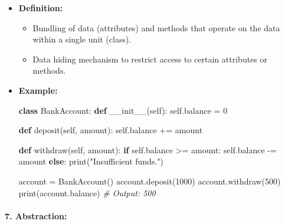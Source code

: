 \documentclass[11pt]{article}
\providecommand{\tightlist}{%
      \setlength{\itemsep}{0pt}\setlength{\parskip}{0pt}}
\newenvironment{Shaded}{}{}
\newcommand{\KeywordTok}[1]{\textcolor[rgb]{0.00,0.44,0.13}{\textbf{{#1}}}}
\newcommand{\DecValTok}[1]{\textcolor[rgb]{0.25,0.63,0.44}{{#1}}}
\newcommand{\StringTok}[1]{\textcolor[rgb]{0.25,0.44,0.63}{{#1}}}
\newcommand{\CommentTok}[1]{\textcolor[rgb]{0.38,0.63,0.69}{\textit{{#1}}}}
\newcommand{\FunctionTok}[1]{\textcolor[rgb]{0.02,0.16,0.49}{{#1}}}
\newcommand{\NormalTok}[1]{{#1}}
\newcommand{\VariableTok}[1]{\textcolor[rgb]{0.10,0.09,0.49}{{#1}}}
\newcommand{\ControlFlowTok}[1]{\textcolor[rgb]{0.00,0.44,0.13}{\textbf{{#1}}}}
\newcommand{\OperatorTok}[1]{\textcolor[rgb]{0.40,0.40,0.40}{{#1}}}
\newcommand{\BuiltInTok}[1]{{#1}}
\begin{document}
\begin{itemize}
\item
  \textbf{Definition:}

  \begin{itemize}
  \tightlist
  \item
    Bundling of data (attributes) and methods that operate on the data
    within a single unit (class).
  \item
    Data hiding mechanism to restrict access to certain attributes or
    methods.
  \end{itemize}
\item
  \textbf{Example:}

\begin{Shaded}
\begin{Highlighting}[]
\KeywordTok{class}\NormalTok{ BankAccount:}
    \KeywordTok{def} \FunctionTok{__init__}\NormalTok{(}\VariableTok{self}\NormalTok{):}
        \VariableTok{self}\NormalTok{.balance }\OperatorTok{=} \DecValTok{0}

    \KeywordTok{def}\NormalTok{ deposit(}\VariableTok{self}\NormalTok{, amount):}
        \VariableTok{self}\NormalTok{.balance }\OperatorTok{+=}\NormalTok{ amount}

    \KeywordTok{def}\NormalTok{ withdraw(}\VariableTok{self}\NormalTok{, amount):}
        \ControlFlowTok{if} \VariableTok{self}\NormalTok{.balance }\OperatorTok{>=}\NormalTok{ amount:}
            \VariableTok{self}\NormalTok{.balance }\OperatorTok{-=}\NormalTok{ amount}
        \ControlFlowTok{else}\NormalTok{:}
            \BuiltInTok{print}\NormalTok{(}\StringTok{"Insufficient funds."}\NormalTok{)}

\NormalTok{account }\OperatorTok{=}\NormalTok{ BankAccount()}
\NormalTok{account.deposit(}\DecValTok{1000}\NormalTok{)}
\NormalTok{account.withdraw(}\DecValTok{500}\NormalTok{)}
\BuiltInTok{print}\NormalTok{(account.balance)  }\CommentTok{# Output: 500}
\end{Highlighting}
\end{Shaded}
\end{itemize}

\paragraph{\texorpdfstring{7.
\textbf{Abstraction:}}{7. Abstraction:}}\label{abstraction}
\end{document}
